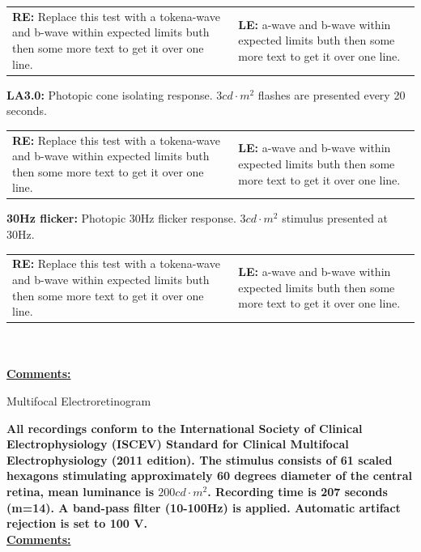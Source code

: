 \documentclass[12pt]{article}
\newenvironment{heading}
{\begin{flushleft}
	 \begin{large}
	\bfseries
}
{\end{large}
	\end{flushleft}
}
\newenvironment{boxed}
{\noindent\begin{lrbox}{\mybox}\begin{minipage}{\textwidth}}
{\end{minipage}\end{lrbox}\fbox{\usebox{\mybox}}}
\begin{document}
\begin{boxed}
		\begin{tabularx}{\linewidth}{X X}
			\textbf{RE:} Replace this test with a tokena-wave and b-wave within expected limits buth then some more text to get it over one line. & \textbf{LE:} a-wave and b-wave within expected limits buth then some more text to get it over one line.\\
		\end{tabularx}
\textbf{LA3.0:} Photopic cone isolating response. $3 cd{\cdot}m^2$ flashes are presented every 20 seconds.\newline
		\begin{tabularx}{\linewidth}{X X}
			\textbf{RE:} Replace this test with a tokena-wave and b-wave within expected limits buth then some more text to get it over one line. & \textbf{LE:} a-wave and b-wave within expected limits buth then some more text to get it over one line.\\
		\end{tabularx}
\textbf{30Hz flicker:} Photopic 30Hz flicker response. $3 cd{\cdot}m^2$ stimulus presented at 30Hz.\newline
		\begin{tabularx}{\linewidth}{X X}
			\textbf{RE:} Replace this test with a tokena-wave and b-wave within expected limits buth then some more text to get it over one line. & \textbf{LE:} a-wave and b-wave within expected limits buth then some more text to get it over one line.\\
		\end{tabularx}
\\
\\
\underline{\textbf{Comments:}} 
\end{boxed}

\begin{boxed}
\begin{heading}
Multifocal Electroretinogram
\end{heading}
{\footnotesize{\textbf{All recordings conform to the International Society of Clinical Electrophysiology (ISCEV) Standard for Clinical Multifocal Electrophysiology (2011 edition). The stimulus consists of 61 scaled hexagons stimulating approximately 60 degrees diameter of the central retina, mean luminance is $200 cd{\cdot}m^2$. Recording time is 207 seconds (m=14). A band-pass filter (10-100Hz) is applied. Automatic artifact rejection is set to 100 {\micro V}.}}}\\

\underline{\textbf{Comments:}} 
\end{boxed}
\end{document}

